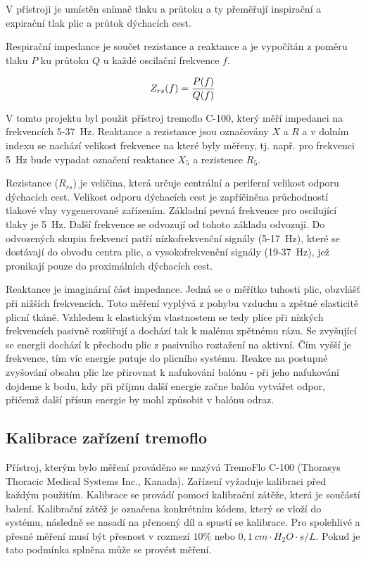 V přístroji je umístěn snímač tlaku a průtoku a ty přeměřují inspirační a expirační tlak plic a průtok dýchacích cest. 

Respirační impedance je součet rezistance a reaktance a je vypočítán z poměru tlaku  $P$ ku průtoku $Q$ u každé oscilační frekvence $f$. \cite{Vlcek2018}

\begin{equation}
	\label{rce:2}
	Z_{rs}(f) = {P(f) \over Q(f)} 
\end{equation}


V tomto projektu byl použit přístroj tremoflo C-100, který měří impedanci na frekvencích 5-37~Hz. Reaktance a rezistance jsou označovány $X$ a $R$ a v dolním indexu se nachází velikost frekvence na které byly měřeny, tj. např. pro frekvenci 5~Hz bude vypadat označení reaktance $X_5$ a rezistence $R_5$. 

Rezistance ($R_{rs}$) je veličina, která určuje centrální a periferní velikost odporu dýchacích cest. Velikost odporu dýchacích cest je zapříčiněna průchodností tlakové vlny vygenerované zařízením. Základní pevná frekvence pro oscilující tlaky je 5~Hz. Další frekvence se odvozují od tohoto základu odvozují. Do odvozených skupin frekvencí patří nízkofrekvenční signály (5-17~Hz), které se dostávají do obvodu centra plic, a vysokofrekvenční signály (19-37~Hz), jež pronikají pouze do proximálních dýchacích cest. 

Reaktance je imaginární část impedance. Jedná se o měřítko tuhosti plic, obzvlášť při nižších frekvencích. Toto měření vyplývá z pohybu vzduchu  a zpětné elasticitě plicní tkáně. Vzhledem k elastickým vlastnostem se tedy plíce při nízkých frekvencích pasivně rozšiřují a dochází tak k malému zpětnému rázu. Se zvyšující se energii dochází k přechodu plic z pasivního roztažení na aktivní. Čím vyšší je frekvence, tím víc energie putuje do plicního systému. Reakce na postupné zvyšování obsahu plic lze přirovnat k nafukování balónu - při jeho nafukování dojdeme k bodu, kdy při příjmu další energie začne balón vytvářet odpor, přičemž další přísun energie by mohl způsobit v balónu odraz.


\subsection{Kalibrace zařízení tremoflo}\label{kalibrace}
Přístroj, kterým bylo měření prováděno se nazývá TremoFlo C-100 (Thorasys Thoracic Medical Systems Inc., Kanada). Zařízení vyžaduje kalibraci před každým použitím. Kalibrace se provádí pomocí kalibrační zátěže, která je součástí balení. Kalibrační zátěž je označena konkrétním kódem, který se vloží do systému, následně  se nasadí na přenosný díl a spustí se kalibrace. Pro spolehlivé a přesné měření musí být přesnost 
v rozmezí $10\%$ nebo $0,1~cm \cdot H_{2}O \cdot s/L$. Pokud je tato podmínka splněna může se provést měření. \cite{Vlcek2018}

